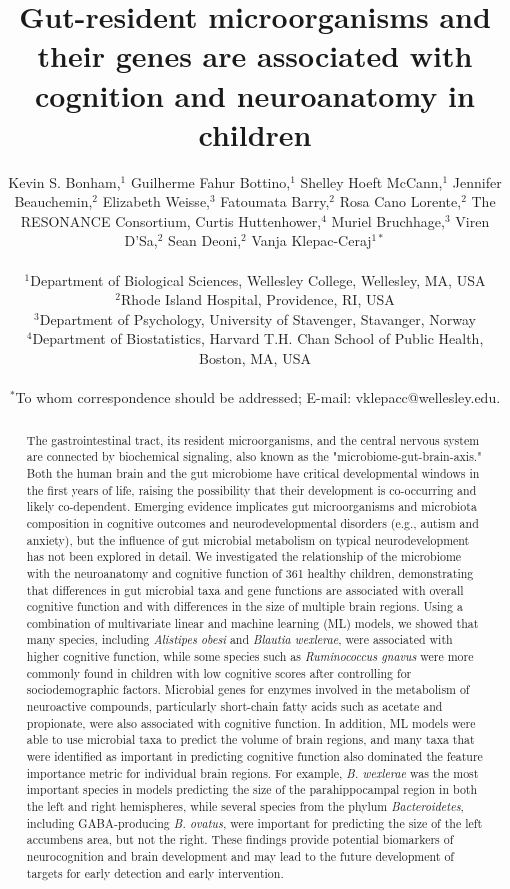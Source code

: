 \documentclass{article}
\title{Gut-resident microorganisms and their genes are associated with cognition and neuroanatomy in children}
\author{%
    \parbox{\linewidth}{\centering
        Kevin S. Bonham,$^{1}$
        Guilherme Fahur Bottino,$^{1}$
        Shelley Hoeft McCann,$^{1}$
        Jennifer Beauchemin,$^{2}$
        Elizabeth Weisse,$^{3}$
        Fatoumata Barry,$^{2}$
        Rosa Cano Lorente,$^{2}$
        The RESONANCE Consortium,
        Curtis Huttenhower,$^{4}$
        Muriel Bruchhage,$^{3}$
        Viren D'Sa,$^{2}$
        Sean Deoni,$^{2}$
        Vanja Klepac-Ceraj$^{1\ast}$
    }
\\
\normalsize{$^{1}$Department of Biological Sciences, Wellesley College, Wellesley, MA, USA}\\
\normalsize{$^{2}$Rhode Island Hospital, Providence, RI, USA}\\
\normalsize{$^{3}$Department of Psychology, University of Stavenger, Stavanger, Norway}\\
\normalsize{$^{4}$Department of Biostatistics, Harvard T.H. Chan School of Public Health, Boston, MA, USA}\\
\\
\normalsize{$^\ast$To whom correspondence should be addressed; E-mail:  vklepacc@wellesley.edu.}
}
\date{}
\begin{document}
\baselineskip24pt

\maketitle 

\begin{abstract}
The gastrointestinal tract, its resident microorganisms, and the central
nervous system are connected by biochemical signaling, also known as the
"microbiome-gut-brain-axis." Both the human brain and the gut microbiome
have critical developmental windows in the first years of life,
raising the possibility that their development is co-occurring and
likely co-dependent. Emerging evidence implicates gut microorganisms and
microbiota composition in cognitive outcomes and neurodevelopmental
disorders (e.g., autism and anxiety), but the influence of gut microbial
metabolism on typical neurodevelopment has not been explored in detail.
We investigated the relationship of the microbiome with the neuroanatomy
and cognitive function of 361 healthy children, demonstrating that
differences in gut microbial taxa and gene functions are associated with
overall cognitive function and with differences in the size of
multiple brain regions.
Using a combination of multivariate linear and machine learning (ML) models,
we showed that many species,
including \emph{Alistipes obesi} and \emph{Blautia wexlerae}, were %
associated with higher cognitive function, while some
species such as \emph{Ruminococcus gnavus} were more commonly found in %
children with low cognitive scores after controlling for sociodemographic factors.
Microbial genes for enzymes involved in the metabolism of
neuroactive compounds, particularly short-chain fatty acids such as
acetate and propionate, were also associated with cognitive function.
In addition, ML models were able to use microbial taxa to predict the
volume of brain regions, and many taxa that were identified
as important in predicting cognitive function also dominated the
feature importance metric for individual brain regions.
For example, \emph{B. wexlerae} %
was the most important species in models predicting the size of the parahippocampal region
in both the left and right hemispheres, while several species from
the phylum \textit{Bacteroidetes}, including GABA-producing %
\emph{B. ovatus}, were important for predicting
the size of the left accumbens area, but not the right. These
findings provide potential biomarkers of neurocognition and brain development
and may lead to the future development of targets for early detection and early
intervention.
\end{abstract}
\end{document}
